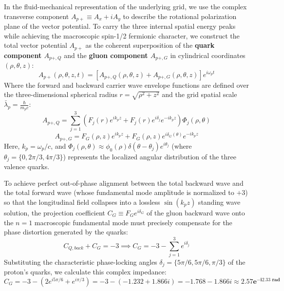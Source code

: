 \documentclass[12pt, a4paper]{article}
\begin{document}
In the fluid-mechanical representation of the underlying grid, we use the complex transverse component $A_{p+} \equiv A_x + i A_y$ to describe the rotational polarization plane of the vector potential. To carry the three internal spatial energy peaks while achieving the macroscopic spin-1/2 fermionic character, we construct the total vector potential $A_{p+}$ as the coherent superposition of the \textbf{quark component $A_{p+, Q}$} and the \textbf{gluon component $A_{p+, G}$} in cylindrical coordinates $(\rho, \theta, z)$:
\begin{equation}
A_{p+}(\rho, \theta, z, t) = \left[ A_{p+, Q}(\rho, \theta, z) + A_{p+, G}(\rho, \theta, z) \right] e^{i\omega_p t} \label{eq:proton_ansatz}
\end{equation}
Where the forward and backward carrier wave envelope functions are defined over the three-dimensional spherical radius $r = \sqrt{\rho^2 + z^2}$ and the grid spatial scale $\bar{\lambda}_p = \frac{\hbar}{m_p c}$:
\begin{equation}
A_{p+, Q} = \sum_{j=1}^3 \left( F_j(r) e^{ik_p z} + F_j(r) e^{i\delta_j} e^{-ik_p z} \right) \Phi_j(\rho, \theta) \label{eq:quark_comp}
\end{equation}
\begin{equation}
A_{p+, G} = F_G(\rho, z) e^{ik_p z} + F_G(\rho, z) e^{i\delta_G(\theta)} e^{-ik_p z} \label{eq:gluon_comp}
\end{equation}
Here, $k_p = \omega_p / c$, and $\Phi_j(\rho, \theta) \approx \phi_0(\rho)\delta(\theta-\theta_j) e^{i\theta_j}$ (where $\theta_j = \{0, 2\pi/3, 4\pi/3\}$) represents the localized angular distribution of the three valence quarks.

To achieve perfect out-of-phase alignment between the total backward wave and the total forward wave (whose fundamental mode amplitude is normalized to $+3$) so that the longitudinal field collapses into a lossless $\sin(k_p z)$ standing wave solution, the projection coefficient $C_G \equiv F_G e^{i\delta_G}$ of the gluon backward wave onto the $n=1$ macroscopic fundamental mode must precisely compensate for the phase distortion generated by the quarks:
\begin{equation}
C_{Q, back} + C_G = -3 \implies C_G = -3 - \sum_{j=1}^3 e^{i\delta_j} \label{eq:gluon_matching}
\end{equation}
Substituting the characteristic phase-locking angles $\delta_j = \{5\pi/6, 5\pi/6, \pi/3\}$ of the proton's quarks, we calculate this complex impedance:
\begin{equation}
C_G = -3 - \left( 2e^{i5\pi/6} + e^{i\pi/3} \right) = -3 - (-1.232 + 1.866i) = -1.768 - 1.866i \approx \mathbf{2.57 e^{-i 2.33 \text{ rad}}} \label{eq:gluon_phase_val}
\end{equation}
\end{document}
